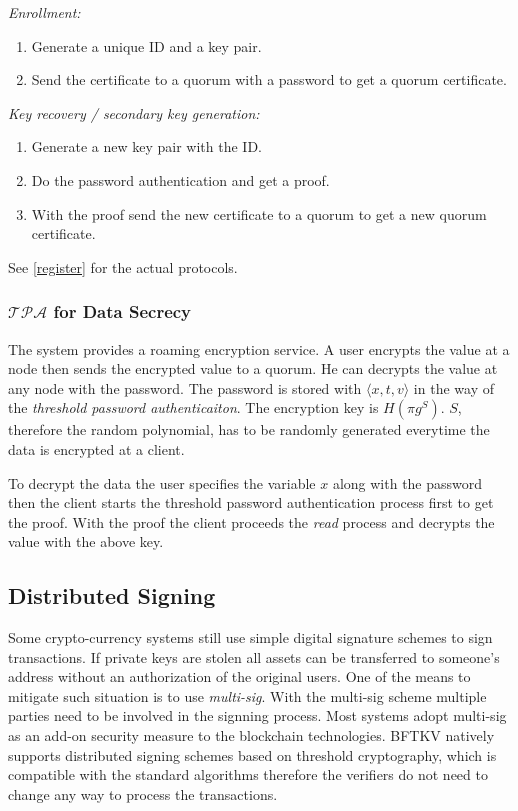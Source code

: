 \noindent
{\em Enrollment:}
\begin{enumerate}
\item Generate a unique ID and a key pair.
\item Send the certificate to a quorum with a password to get a
  quorum certificate.
\end{enumerate}

\noindent
{\em Key recovery / secondary key generation:}
\begin{enumerate}
\item Generate a new key pair with the ID.
\item Do the password authentication and get a proof.
\item With the proof send the new certificate to a quorum to get a new
  quorum certificate.
\end{enumerate}
\ifdefined\ABSTRACT
\else
See \ref{register} for the actual protocols.
\fi


\subsubsection*{$\mathcal{TPA}$ for Data Secrecy}
The system provides a roaming encryption service. A user encrypts
the value at a node then sends the encrypted value to a quorum. He can
decrypts the value at any node with the password. The password is
stored with $\langle x, t, v \rangle$ in the way of the {\em threshold
password authenticaiton}. The encryption key is $H(\pi g^S)$. $S$,
therefore the random polynomial, has to be randomly generated
everytime the data is encrypted at a client.

To decrypt the data the user specifies the variable $x$ along with the
password then the client starts the threshold password authentication
process first to get the proof. With the proof the client proceeds the
{\em read} process and decrypts the value with the above key.

\subsection{Distributed Signing}
Some crypto-currency systems still use simple digital signature
schemes to sign transactions. If private keys are stolen all assets
can be transferred to someone's address without an authorization of
the original users. One of the means to mitigate such situation is to
use {\em multi-sig}. With the multi-sig scheme multiple parties need
to be involved in the signning process. Most systems adopt multi-sig
as an add-on security measure to the blockchain technologies. BFTKV
natively supports distributed signing schemes based on threshold
cryptography, which is compatible with the standard algorithms
therefore the verifiers do not need to change any way to process the
transactions.

